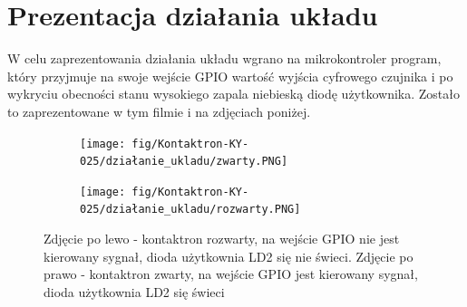 \documentclass[11pt, a4paper]{article}
\begin{document}


\section{Prezentacja działania układu}
W celu zaprezentowania działania układu wgrano na mikrokontroler program, który przyjmuje na swoje wejście GPIO wartość wyjścia cyfrowego czujnika i po wykryciu obecności stanu wysokiego zapala niebieską diodę użytkownika. Zostało to zaprezentowane w tym filmie \cite{youtube} i na zdjęciach poniżej. 

\vspace{0.2cm}
\begin{figure}[H]
\centering
\begin{subfigure}{.5\textwidth}
  \centering
  \texttt{[image: fig/Kontaktron-KY-025/działanie\_ukladu/zwarty.PNG]}
  \label{fig:sub1}
\end{subfigure}%
\begin{subfigure}{.5\textwidth}
  \centering
  \texttt{[image: fig/Kontaktron-KY-025/działanie\_ukladu/rozwarty.PNG]}
  \label{fig:sub1}
\end{subfigure}
\caption{Zdjęcie po lewo - kontaktron rozwarty, na wejście GPIO nie jest kierowany sygnał, dioda użytkownia LD2 się nie świeci. Zdjęcie po prawo - kontaktron zwarty, na wejście GPIO jest kierowany sygnał, dioda użytkownia LD2 się świeci}
\label{fig:test}
\end{figure}
\vspace{0.2cm}
\end{document}
